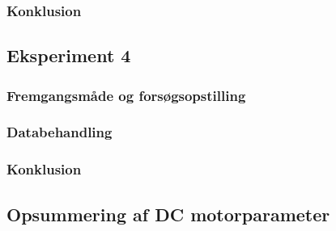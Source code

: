\subsubsection{Konklusion}


\subsection{Eksperiment 4}
\subsubsection{Fremgangsmåde og forsøgsopstilling}
\subsubsection{Databehandling}

\subsubsection{Konklusion}

\subsection{Opsummering af DC motorparameter}